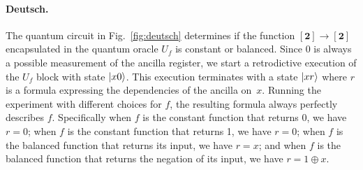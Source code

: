 \documentclass{article}
\newcommand{\finset}[1]{[\mathbf{#1}]}
\begin{document}
\begin{refsection}
\paragraph*{Deutsch.} The quantum circuit in Fig.~\ref{fig:deutsch} determines
if the function $\finset{2} \rightarrow \finset{2}$ encapsulated in
the quantum oracle $U_f$ is constant or balanced. Since 0 is always a
possible measurement of the ancilla register, we start a retrodictive
execution of the $U_f$ block with state $\ket{x0}$. This execution
terminates with a state $\ket{xr}$ where $r$ is a formula expressing
the dependencies of the ancilla on~$x$. Running the experiment with
different choices for $f$, the resulting formula always perfectly
describes $f$. Specifically when $f$ is the constant function that
returns 0, we have $r=0$; when $f$ is the constant function that
returns 1, we have $r=0$; when $f$ is the balanced function that
returns its input, we have $r=x$; and when $f$ is the balanced function that
returns the negation of its input, we have $r=1\oplus x$.


\end{refsection}
\end{document}
